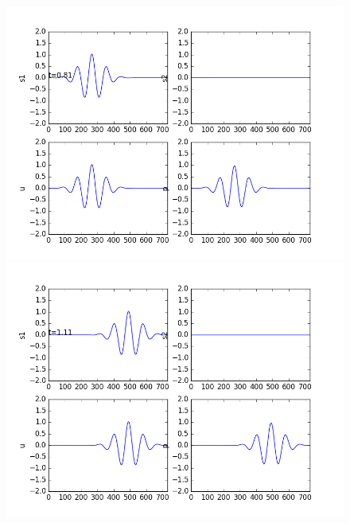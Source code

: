 \documentclass[12pt]{article}
\begin{document}
\begin{enumerate}[(a)]
\begin{figure}[H]
\end{figure}
\begin{figure}[H]
\centering\includegraphics[scale=0.4]{acoustic_wavepacket_frames/acoustic_eqn_fig15.png}
\centering\includegraphics[scale=0.4]{acoustic_wavepacket_frames/acoustic_eqn_fig20.png}

\end{figure}
\end{enumerate}
\end{document}
